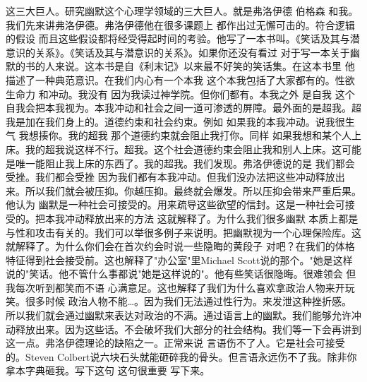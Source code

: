 这三大巨人。研究幽默这个心理学领域的三大巨人。就是弗洛伊德 伯格森 和我。我们先来讲弗洛伊德。弗洛伊德他在很多课题上 都作出过无懈可击的。符合逻辑的假设 而且这些假设都将经受得起时间的考验。他写了一本书叫。《笑话及其与潜意识的关系》。《笑话及其与潜意识的关系》。如果你还没有看过 对于写一本关于幽默的书的人来说。这本书是自《利末记》以来最不好笑的笑话集。在这本书里 他描述了一种典范意识。在我们内心有一个本我 这个本我包括了大家都有的。性欲 生命力 和冲动。我没有 因为我读过神学院。但你们都有。本我之外 是自我 这个自我会把本我视为。本我冲动和社会之间一道可渗透的屏障。最外面的是超我。超我是加在我们身上的。道德约束和社会约束。例如 如果我的本我冲动。说我很生气 我想揍你。我的超我 那个道德约束就会阻止我打你。同样 如果我想和某个人上床。我的超我说这样不行。超我。这个社会道德约束会阻止我和别人上床。这可能是唯一能阻止我上床的东西了。我的超我。我们发现。弗洛伊德说的是 我们都会受挫。我们都会受挫 因为我们都有本我冲动。但我们没办法把这些冲动释放出来。所以我们就会被压抑。你越压抑。最终就会爆发。所以压抑会带来严重后果。他认为 幽默是一种社会可接受的。用来疏导这些欲望的信封。这是一种社会可接受的。把本我冲动释放出来的方法 这就解释了。为什么我们很多幽默 本质上都是与性和攻击有关的。我们可以举很多例子来说明。把幽默视为一个心理保险库。这就解释了。为什么你们会在首次约会时说一些隐晦的黄段子 对吧？在我们的体格特征得到社会接受前。这也解释了"办公室"里Michael Scott说的那个。"她是这样说的"笑话。他不管什么事都说"她是这样说的"。他有些笑话很隐晦。很难领会 但我每次听到都笑而不语 心满意足。这也解释了我们为什么喜欢拿政治人物来开玩笑。很多时候 政治人物不能…。因为我们无法通过性行为。来发泄这种挫折感。所以我们就会通过幽默来表达对政治的不满。通过语言上的幽默。我们能够允许冲动释放出来。因为这些话。不会破坏我们大部分的社会结构。我们等一下会再讲到这一点。弗洛伊德理论的缺陷之一。正常来说 言语伤不了人。它是社会可接受的。Steven Colbert说六块石头就能砸碎我的骨头。但言语永远伤不了我。除非你拿本字典砸我。写下这句 这句很重要 写下来。 


